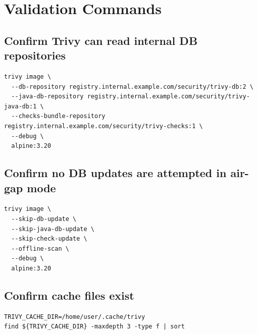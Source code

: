\documentclass[10pt]{article}
\begin{document}
\section{Validation Commands}
\subsection{Confirm Trivy can read internal DB repositories}
\begin{lstlisting}[style=shell]
trivy image \
  --db-repository registry.internal.example.com/security/trivy-db:2 \
  --java-db-repository registry.internal.example.com/security/trivy-java-db:1 \
  --checks-bundle-repository registry.internal.example.com/security/trivy-checks:1 \
  --debug \
  alpine:3.20
\end{lstlisting}

\subsection{Confirm no DB updates are attempted in air-gap mode}
\begin{lstlisting}[style=shell]
trivy image \
  --skip-db-update \
  --skip-java-db-update \
  --skip-check-update \
  --offline-scan \
  --debug \
  alpine:3.20
\end{lstlisting}

\subsection{Confirm cache files exist}
\begin{lstlisting}[style=shell]
TRIVY_CACHE_DIR=/home/user/.cache/trivy
find ${TRIVY_CACHE_DIR} -maxdepth 3 -type f | sort
\end{lstlisting}
\end{document}
